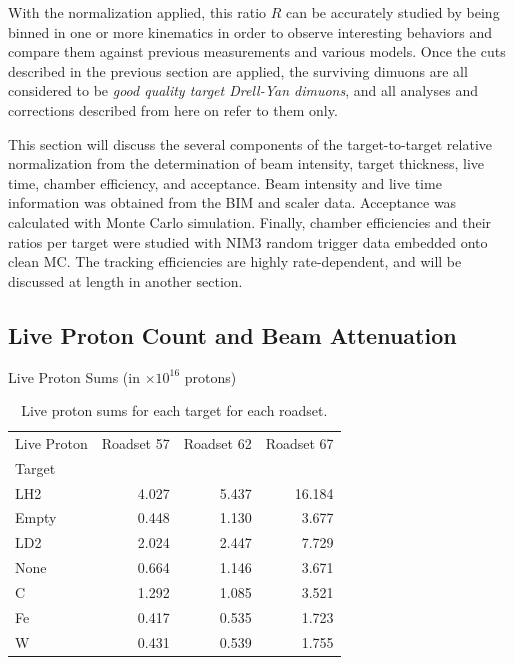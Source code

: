 With the normalization applied, this ratio $R$ can be accurately studied by being binned in one or more kinematics in order to observe interesting behaviors and compare them against previous measurements and various models. Once the cuts described in the previous section are applied, the surviving dimuons are all considered to be \emph{good quality target Drell-Yan dimuons}, and all analyses and corrections described from here on refer to them only.

This section will discuss the several components of the target-to-target relative normalization from the determination of beam intensity, target thickness, live time, chamber efficiency, and acceptance. Beam intensity and live time information was obtained from the BIM and scaler data. Acceptance was calculated with Monte Carlo simulation. Finally, chamber efficiencies and their ratios per target were studied with NIM3 random trigger data embedded onto clean MC. The tracking efficiencies are highly rate-dependent, and will be discussed at length in another section.

\subsection{Live Proton Count and Beam Attenuation}\label{sec:livep}

\begin{table}
	\centering
	\caption*{Live Proton Sums (in $\times 10^{16}$ protons)}
	\vspace{-10px}
	\begin{tabular}{lrrr}
		\toprule
		Live Proton  &  Roadset 57 &  Roadset 62 &  Roadset 67  \\
		Target  &                    &                     &                    \\
		\midrule
		LH2    &            4.027 &           5.437 &          16.184 \\
		Empty  &        0.448 &           1.130 &           3.677 \\
		LD2     &       2.024 &           2.447 &           7.729 \\
		None   &        0.664 &           1.146 &           3.671 \\
		C         &      1.292 &           1.085 &           3.521 \\
		Fe        &      0.417 &           0.535 &           1.723 \\
		W        &      0.431 &           0.539 &           1.755 \\
		\bottomrule
	\end{tabular}
	\caption{Live proton sums for each target for each roadset.}
	\label{tab:livep}
\end{table}

